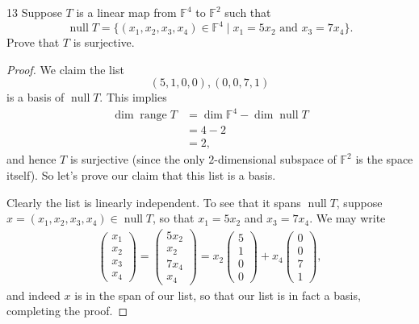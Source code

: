 \documentclass[11pt]{extarticle}
\newenvironment{problem}[1]{\begin{prob*}{#1}{}}{\end{prob*}}
\newcommand{\F}{\mathbb{F}}
\DeclareMathOperator{\Null}{null}
\DeclareMathOperator{\Range}{range}
\begin{document}
\begin{problem}{13}
Suppose $T$ is a linear map from $\F^4$ to $\F^2$ such that
\begin{equation*}
\Null T = \{(x_1,x_2,x_3,x_4)\in\F^4\mid x_1 = 5x_2\text{ and }x_3 = 7x_4\}.
\end{equation*}
Prove that $T$ is surjective.
\end{problem}
\begin{proof}
We claim the list
\begin{equation*}
(5, 1, 0, 0), (0, 0, 7, 1)
\end{equation*}
is a basis of $\Null T$.  This implies
\begin{align*}
\dim \Range T &= \dim\F^4 - \dim\Null T\\
&= 4 - 2\\
&= 2,
\end{align*}
and hence $T$ is surjective (since the only $2$-dimensional subspace of $\F^2$ is the space itself).  So let's prove our claim that this list is a basis.  
\par Clearly the list is linearly independent.  To see that it spans $\Null T$, suppose $x=(x_1,x_2,x_3,x_4)\in \Null T$, so that $x_1 = 5x_2$ and $x_3 = 7x_4$.  We may write
\begin{align*}
\begin{pmatrix}x_1\\x_2\\x_3\\x_4 \end{pmatrix} = \begin{pmatrix}5x_2\\x_2\\7x_4\\x_4 \end{pmatrix} = x_2\begin{pmatrix}5\\1\\0\\0\end{pmatrix}  + x_4\begin{pmatrix}0\\0\\7\\1\end{pmatrix},
\end{align*}
and indeed $x$ is in the span of our list, so that our list is in fact a basis, completing the proof.
\end{proof}
\end{document}
